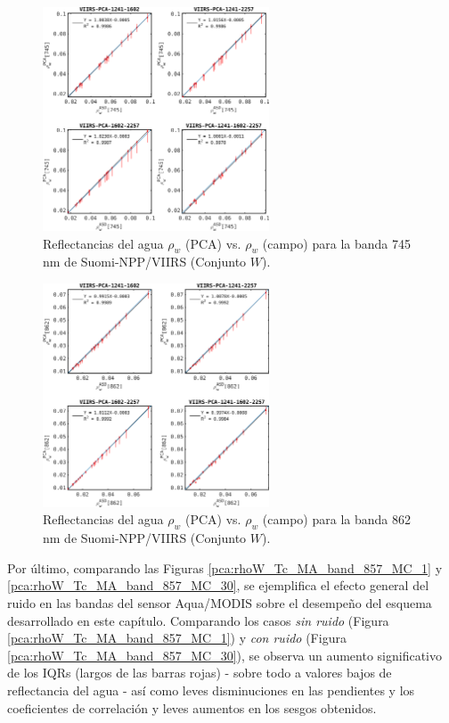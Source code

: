         \begin{figure}
        \centering
        \includegraphics[width=0.6\textwidth]{pca/figures/rhoW_Tc_VIIRS_band_745_MC_1.png}
        \caption[Reflectancias del agua (PCA vs. campo) para la banda 745 nm de VIIRS.]{Reflectancias del agua $\rho_{w}$ (PCA) vs. $\rho_{w}$ (campo) para la banda 745 nm de Suomi-NPP/VIIRS (Conjunto $W$).}
        \label{pca:rhoW_Tc_VIIRS_band_745_MC_1}
        \end{figure}

        \begin{figure}
        \centering
        \includegraphics[width=0.6\textwidth]{pca/figures/rhoW_Tc_VIIRS_band_862_MC_1.png}
        \caption[Reflectancias del agua (PCA vs. campo) para la banda 862 nm de VIIRS.]{Reflectancias del agua $\rho_{w}$ (PCA) vs. $\rho_{w}$ (campo) para la banda 862 nm de Suomi-NPP/VIIRS (Conjunto $W$).}
        \label{pca:rhoW_Tc_VIIRS_band_862_MC_1}
        \end{figure}

        Por último, comparando las Figuras \ref{pca:rhoW_Tc_MA_band_857_MC_1} y \ref{pca:rhoW_Tc_MA_band_857_MC_30}, se ejemplifica el efecto general del ruido en las bandas del sensor Aqua/MODIS sobre el desempeño del esquema desarrollado en este capítulo. Comparando los casos \textit{sin ruido} (Figura \ref{pca:rhoW_Tc_MA_band_857_MC_1}) y \textit{con ruido} (Figura \ref{pca:rhoW_Tc_MA_band_857_MC_30}), se observa un aumento significativo de los IQRs (largos de las barras rojas) - sobre todo a valores bajos de reflectancia del agua - así como leves disminuciones en las pendientes y los coeficientes de correlación y leves aumentos en los sesgos obtenidos.  

